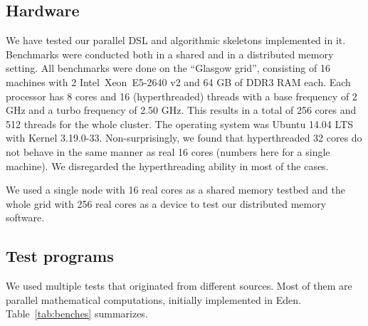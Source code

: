 \newcommand{\speedupdiffplot}[7]{
\begin{tikzpicture}
\begin{axis}[title={#1},
title style={align=center},
scale only axis, width=#7,
xlabel=Threads,
xtick distance=#4,
ytick distance=0.5,
ylabel=Absolute speedup difference,
ylabel near ticks,
grid=major,
legend entries={#2},
legend style={at={(0.99,0.99)},anchor=north east},
max space between ticks=50pt,
grid style={line width=.1pt, draw=gray!10},
major grid style={line width=.2pt,draw=gray!50},
xmin=-1,
xmax=#6]
#5
\end{axis}
\end{tikzpicture}
}

\subsection{Hardware}

We have tested our parallel DSL and algorithmic skeletons implemented
in it. Benchmarks were conducted both in a shared and in a distributed
memory setting. All benchmarks were done on the ``Glasgow grid'', consisting of
16 machines with 2 Intel\SymbReg~Xeon\SymbReg~E5-2640 v2 and 64 GB of DDR3 RAM each. Each processor has 8 cores and 16 (hyperthreaded) threads with a base frequency of 2 GHz and a turbo frequency of 2.50 GHz. This results in a total of 256 cores and 512 threads for the whole cluster. The operating system was Ubuntu 14.04 LTS with Kernel 3.19.0-33. Non-surprisingly, we found that hyperthreaded 32 cores do not behave in the same manner as real 16 cores (numbers here for a single machine). We disregarded the hyperthreading ability in most of the
cases.

We used a single node with 16 real cores as a shared memory testbed
and the whole grid with 256 real cores as a device to test our
distributed memory software.

\subsection{Test programs}

We used multiple tests that originated from different
sources. Most of them are parallel mathematical computations, initially
implemented in Eden. Table~\ref{tab:benches} summarizes.

